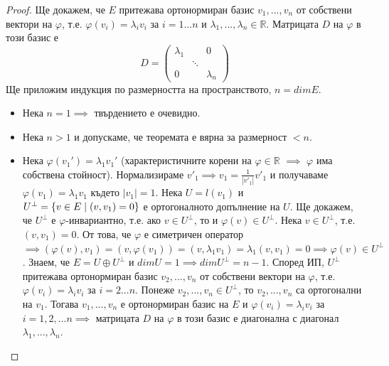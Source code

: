 \documentclass{article}
\begin{document}
\begin{proof}
Ще докажем, че $E$ притежава ортонормиран базис $v_1, ..., v_n$ от собствени вектори на $\varphi$, т.е. $\varphi(v_i) = \lambda_iv_i$
за $i = 1 ... n$ и $\lambda_1, ..., \lambda_n \in \mathbb{R}$. \newline Матрицата $D$ на $\varphi$ в този базис е
$$D = \begin{pmatrix} \lambda_1 & & 0 \\ & \ddots & \\ 0 & & \lambda_n \end{pmatrix}$$
Ще приложим индукция по размерността на пространството, $n = dimE$.
\begin{itemize}
    \item Нека $n = 1 \implies$ твърдението е очевидно.
    \item Нека $n > 1$ и допускаме, че теоремата е вярна за размерност $< n$.
    \item Нека $\varphi(v_1') = \lambda_1v_1'$ (характеристичните корени на $\varphi \in \mathbb{R}$
    $\implies$ $\varphi$ има собствена стойност). Нормализираме $v'_1 \implies v_1 = \frac{1}{|v'_1|}v'_1$ и получаваме
    $\varphi(v_1) = \lambda_1v_1$ където $|v_1| = 1$. \newline Нека $U = l(v_1)$ и $U^{\perp} = \{v \in E \hspace{0.1cm} |
    \hspace{0.1cm}(v, v_1) = 0\}$ е ортогоналното допълнение на $U$.
    Ще докажем, че $U^{\perp}$ е $\varphi$-инвариантно, т.е. ако $v \in U^{\perp}$, то и $\varphi(v) \in U^{\perp}$.
    Нека $v \in U^{\perp}$, т.е. $(v, v_1) = 0$. От това, че $\varphi$ е симетричен оператор $\implies (\varphi(v), v_1) =
    (v, \varphi(v_1)) = (v, \lambda_1v_1) = \lambda_1(v, v_1) = 0 \implies \varphi(v) \in U^{\perp}$. \newline
    Знаем, че $E = U \oplus U^{\perp}$ и $dimU = 1 \implies dimU^{\perp} = n - 1$. Според ИП, $U^{\perp}$ притежава ортонормиран базис $v_2, ..., v_n$
    от собствени вектори на $\varphi$, т.е. $\varphi(v_i) = \lambda_iv_i$ за $i = 2 ... n$. Понеже $v_2, ..., v_n \in U^{\perp}$, то $v_2, ..., v_n$ са
    ортогонални на $v_1$. Тогава $v_1, ..., v_n$ е ортонормиран базис на $E$ и $\varphi(v_i) = \lambda_iv_i$ за $i = 1, 2, ... n \implies$
    матрицата $D$ на $\varphi$ в този базис е диагонална с диагонал $\lambda_1, ..., \lambda_n$.
\end{itemize}
\end{proof}

\section*{\centering \color{lightGreen}{Висша алгебра}}
\end{document}
